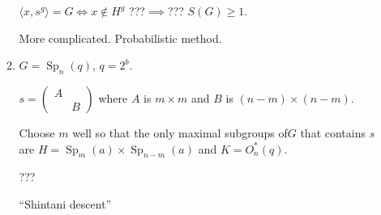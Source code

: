 \documentclass[svgnames]{article}
\theoremstyle{definition}
\theoremstyle{remark}
\DeclareMathOperator{\Sp}{Sp}
\begin{document}
\begin{enumerate}
\begin{enumerate}[label=(\alph*)]
	$\langle x, s^g \rangle = G \iff x \notin H^g$ ???$\implies$??? $S(G) \ge 1$.
	
	More complicated. Probabilistic method.
	
	\item $G = \Sp_n(q)$, $q = 2^b$.
	
	$s = \begin{pmatrix}
		A &\\ & B
	\end{pmatrix}$
	where $A$ is $m \times m$ and $B$ is $(n - m) \times (n - m)$.
	
	Choose $m$ well so that the only maximal subgroups of$G$ that contains $s$ are $H = \Sp_m(a) \times \Sp_{n-m}(a)$ and $K = O_n^*(q)$.
	
	???
	
	``Shintani descent''
	
\end{enumerate}
\end{enumerate}
\end{document}
